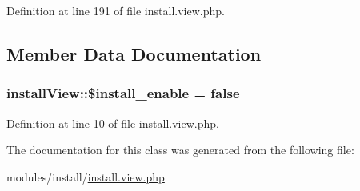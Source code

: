 Definition at line 191 of file install.\-view.\-php.



\subsection{Member Data Documentation}
\hypertarget{classinstallView_af8e64ea4a91e88a6539bef37e73d3a05}{
\subsubsection[{\$install\-\_\-enable}]{\setlength{\rightskip}{0pt plus 5cm}install\-View\-::\$install\-\_\-enable = false}}\label{classinstallView_af8e64ea4a91e88a6539bef37e73d3a05}


Definition at line 10 of file install.\-view.\-php.



The documentation for this class was generated from the following file\-:\begin{DoxyCompactItemize}
\item 
modules/install/\hyperlink{install_8view_8php}{install.\-view.\-php}\end{DoxyCompactItemize}
